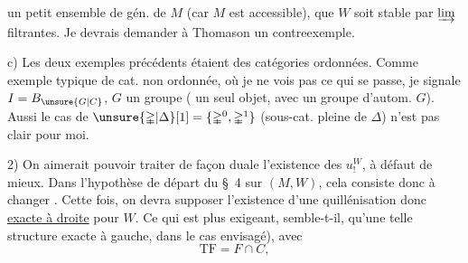 un petit ensemble de gén. de $M$ (car $M$ est accessible), que $W$ soit stable par $\varinjlim$ filtrantes. Je devrais demander à Thomason   un contreexemple.

c) Les deux exemples précédents étaient des catégories ordonnées. Comme exemple typique de cat. non ordonnée, où je ne vois pas ce qui se passe, je signale $I=B_{\unsure{G|C}}$, $G$ un groupe ( un seul objet, avec un groupe d'autom. $G$). Aussi le cas de $\unsure{\mathbb{\Delta}|\Delta}[1]=\{\mathbb{\Delta}^0,\mathbb{\Delta}^1\}$ (sous-cat. pleine de $\mathbb{\Delta}$) n'est pas clair pour moi.

2) On aimerait pouvoir traiter de façon duale l'existence des $u_!^W$, à défaut de mieux. Dans l'hypothèse de départ du \S\ 4 sur $(M,W)$, cela consiste donc à changer . Cette fois, on devra supposer l'existence d'une quillénisation donc \uline{exacte à droite} pour $W$. Ce qui est plus exigeant, semble-t-il, qu'une telle structure exacte à gauche, dans le cas envisagé), avec
\[
\mathrm{TF}=F\cap C,
\]
